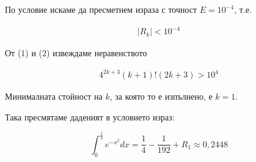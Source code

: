\documentclass{article}
\begin{document}
По условие искаме да пресметнем израза с точност \( E = 10^{-4} \), т.е.

\begin{gather}
    |R_k| < 10^{-4}
\end{gather}

От (1) и (2) извеждаме неравенството

\begin{gather*}
    4^{2k+3}(k+1)!(2k+3) > 10^4
\end{gather*}

Минималната стойност на \( k \), за която то е изпълнено, е \( k = 1 \).

Така пресмятаме даденият в условието израз:

\[
    \int_0^\frac{1}{4}e^{-x^2}dx = \frac{1}{4} - \frac{1}{192} + R_1 \approx 0,2448
\]
\end{document}
